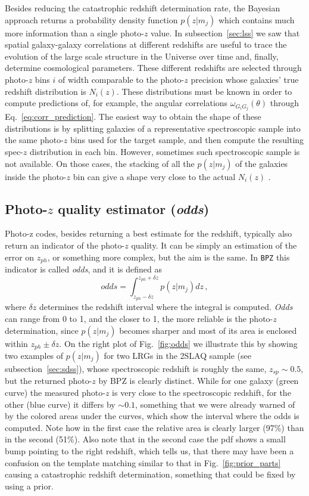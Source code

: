 Besides reducing the catastrophic redshift determination rate, the Bayesian approach returns a probability density function $p(z|m_j)$ which contains much more information than a single photo-$z$ value. In subsection~\ref{sec:lss} we saw that spatial galaxy-galaxy correlations at different redshifts are useful to trace the evolution of the large scale structure in the Universe over time and, finally, determine cosmological parameters. These different redshifts are selected through photo-$z$ bins $i$ of width comparable to the photo-$z$ precision whose galaxies' true redshift distribution is $N_i(z)$. These distributions must be known in order to compute predictions of, for example, the angular correlations $\omega_{G_i G_j}(\theta)$ through Eq.~\ref{eq:corr_prediction}. The easiest way to obtain the shape of these distributions is by splitting galaxies of a representative spectroscopic sample into the same photo-$z$ bins used for the target sample, and then compute the resulting spec-$z$ distribution in each bin. However, sometimes such spectroscopic sample is not available. On those cases, the stacking of all the $p(z|m_j)$ of the galaxies inside the photo-$z$ bin can give a shape very close to the actual $N_i(z)$ \citep{Bonnett2013}.

\subsection{Photo-$z$ quality estimator (\textit{odds})}
Photo-z codes, besides returning a best estimate for the redshift, typically also return an indicator of the photo-$z$ quality. It can be simply an estimation of the error on $z_{ph}$, or something more complex, but the aim is the same. In \texttt{BPZ} this indicator is called \textit{odds}, and it is defined as
\begin{equation}
odds = \int^{z_{ph}+\delta z}_{z_{ph}-\delta z}p(z|m_j)dz \, ,
\label{odds}
\end{equation}
where $\delta z$ determines the redshift interval where the integral is computed. \textit{Odds} can range from 0 to 1, and the closer to 1, the more reliable is the photo-$z$ determination, since $p(z|m_j)$ becomes sharper and most of its area is enclosed within $z_{ph}\pm \delta z$. On the right plot of Fig.~\ref{fig:odds} we illustrate this by showing two examples of $p(z|m_j)$ for two LRGs in the 2SLAQ sample (see subsection~\ref{sec:sdss}), whose spectroscopic redshift is roughly the same, $z_{sp} \sim 0.5$, but the returned photo-$z$ by BPZ is clearly distinct. While for one galaxy (green curve) the measured photo-$z$ is very close to the spectroscopic redshift, for the other (blue curve) it differs by $\sim0.1$, something that we were already warned of by the colored areas under the curves, which show the interval where the odds is computed. Note how in the first case the relative area is clearly larger (97\%) than in the second (51\%). Also note that in the second case the pdf shows a small bump pointing to the right redshift, which tells us, that there may have been a confusion on the template matching similar to that in Fig.~\ref{fig:prior_parts} causing a catastrophic redshift determination, something that could be fixed by using a prior.


